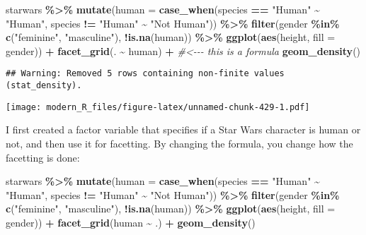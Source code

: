 \documentclass[
]{article}
\newenvironment{Shaded}{\begin{snugshade}}{\end{snugshade}}
\newcommand{\CommentTok}[1]{\textcolor[rgb]{0.56,0.35,0.01}{\textit{#1}}}
\newcommand{\DataTypeTok}[1]{\textcolor[rgb]{0.13,0.29,0.53}{#1}}
\newcommand{\KeywordTok}[1]{\textcolor[rgb]{0.13,0.29,0.53}{\textbf{#1}}}
\newcommand{\NormalTok}[1]{#1}
\newcommand{\OperatorTok}[1]{\textcolor[rgb]{0.81,0.36,0.00}{\textbf{#1}}}
\newcommand{\StringTok}[1]{\textcolor[rgb]{0.31,0.60,0.02}{#1}}
\begin{document}
\begin{Shaded}
\begin{Highlighting}[]
\NormalTok{starwars }\OperatorTok{\%\textgreater{}\%}
\StringTok{  }\KeywordTok{mutate}\NormalTok{(}\DataTypeTok{human =} \KeywordTok{case\_when}\NormalTok{(species }\OperatorTok{==}\StringTok{ "Human"} \OperatorTok{\textasciitilde{}}\StringTok{ "Human"}\NormalTok{,}
\NormalTok{                           species }\OperatorTok{!=}\StringTok{ "Human"} \OperatorTok{\textasciitilde{}}\StringTok{ "Not Human"}\NormalTok{)) }\OperatorTok{\%\textgreater{}\%}
\StringTok{  }\KeywordTok{filter}\NormalTok{(gender }\OperatorTok{\%in\%}\StringTok{ }\KeywordTok{c}\NormalTok{(}\StringTok{"feminine"}\NormalTok{, }\StringTok{"masculine"}\NormalTok{), }\OperatorTok{!}\KeywordTok{is.na}\NormalTok{(human)) }\OperatorTok{\%\textgreater{}\%}
\StringTok{  }\KeywordTok{ggplot}\NormalTok{(}\KeywordTok{aes}\NormalTok{(height, }\DataTypeTok{fill =}\NormalTok{ gender)) }\OperatorTok{+}
\StringTok{  }\KeywordTok{facet\_grid}\NormalTok{(. }\OperatorTok{\textasciitilde{}}\StringTok{ }\NormalTok{human) }\OperatorTok{+}\StringTok{ }\CommentTok{\#\textless{}{-}{-}{-} this is a formula}
\StringTok{  }\KeywordTok{geom\_density}\NormalTok{()}
\end{Highlighting}
\end{Shaded}

\begin{verbatim}
## Warning: Removed 5 rows containing non-finite values (stat_density).
\end{verbatim}

\texttt{[image: modern\_R\_files/figure-latex/unnamed-chunk-429-1.pdf]}

I first created a factor variable that specifies if a Star Wars character is human or not, and then
use it for facetting. By changing the formula, you change how the facetting is done:

\begin{Shaded}
\begin{Highlighting}[]
\NormalTok{starwars }\OperatorTok{\%\textgreater{}\%}
\StringTok{  }\KeywordTok{mutate}\NormalTok{(}\DataTypeTok{human =} \KeywordTok{case\_when}\NormalTok{(species }\OperatorTok{==}\StringTok{ "Human"} \OperatorTok{\textasciitilde{}}\StringTok{ "Human"}\NormalTok{,}
\NormalTok{                           species }\OperatorTok{!=}\StringTok{ "Human"} \OperatorTok{\textasciitilde{}}\StringTok{ "Not Human"}\NormalTok{)) }\OperatorTok{\%\textgreater{}\%}
\StringTok{  }\KeywordTok{filter}\NormalTok{(gender }\OperatorTok{\%in\%}\StringTok{ }\KeywordTok{c}\NormalTok{(}\StringTok{"feminine"}\NormalTok{, }\StringTok{"masculine"}\NormalTok{), }\OperatorTok{!}\KeywordTok{is.na}\NormalTok{(human)) }\OperatorTok{\%\textgreater{}\%}
\StringTok{  }\KeywordTok{ggplot}\NormalTok{(}\KeywordTok{aes}\NormalTok{(height, }\DataTypeTok{fill =}\NormalTok{ gender)) }\OperatorTok{+}
\StringTok{  }\KeywordTok{facet\_grid}\NormalTok{(human }\OperatorTok{\textasciitilde{}}\StringTok{ }\NormalTok{.) }\OperatorTok{+}
\StringTok{  }\KeywordTok{geom\_density}\NormalTok{()}
\end{Highlighting}
\end{Shaded}
\end{document}
